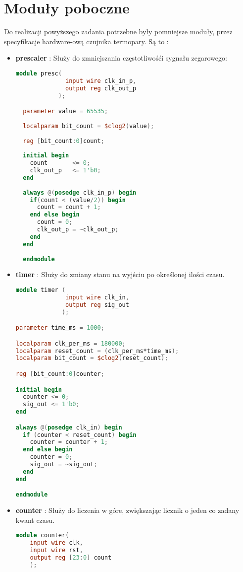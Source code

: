 \documentclass[a4paper,12pt]{article}
\begin{document}
\section{Moduły poboczne}

Do realizacji powyższego zadania potrzebne były pomniejsze moduły, przez specyfikacje hardware-ową czujnika termopary. Są to :

\begin{itemize}
  \item \textbf{prescaler} : Służy do zmniejszania częstotliwośći sygnału zegarowego:
  \begin{lstlisting}[language=verilog]
    module presc(
              input wire clk_in_p,
              output reg clk_out_p
            );

  parameter value = 65535;
  
  localparam bit_count = $clog2(value);
  
  reg [bit_count:0]count;
  
  initial begin
    count       <= 0;
    clk_out_p   <= 1'b0;
  end
  
  always @(posedge clk_in_p) begin
    if(count < (value/2)) begin
      count = count + 1;
    end else begin
      count = 0;
      clk_out_p = ~clk_out_p;
    end
  end
  
  endmodule
  \end{lstlisting}

  \item \textbf{timer} : Służy do zmiany stanu na wyjściu po określonej ilości czasu.
  \begin{lstlisting}[language=verilog]
  module timer (
              input wire clk_in,
              output reg sig_out
             );

parameter time_ms = 1000;

localparam clk_per_ms = 180000;
localparam reset_count = (clk_per_ms*time_ms);
localparam bit_count = $clog2(reset_count);

reg [bit_count:0]counter;

initial begin
  counter <= 0;
  sig_out <= 1'b0;
end

always @(posedge clk_in) begin
  if (counter < reset_count) begin
    counter = counter + 1;
  end else begin
    counter = 0;
    sig_out = ~sig_out;
  end
end

endmodule
  \end{lstlisting}
  \item \textbf{counter} : Służy do liczenia w góre, zwiększając licznik o jeden co zadany kwant czasu.
  \begin{lstlisting}[language=verilog]
  module counter(
    input wire clk,
    input wire rst,
    output reg [23:0] count
    );


\end{lstlisting}
\end{itemize}
\end{document}
